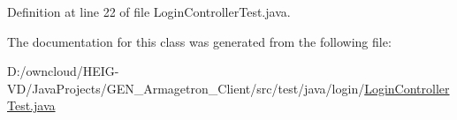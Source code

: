 Definition at line 22 of file Login\+Controller\+Test.\+java.



The documentation for this class was generated from the following file\+:\begin{DoxyCompactItemize}
\item 
D\+:/owncloud/\+H\+E\+I\+G-\/\+V\+D/\+Java\+Projects/\+G\+E\+N\+\_\+\+Armagetron\+\_\+\+Client/src/test/java/login/\hyperlink{_login_controller_test_8java}{Login\+Controller\+Test.\+java}\end{DoxyCompactItemize}
